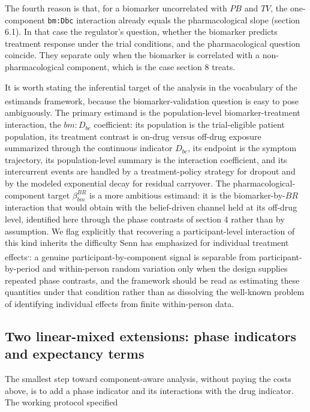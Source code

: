 \documentclass[
  11pt,
]{article}
\begin{document}
The fourth reason is that, for a biomarker uncorrelated with \(PB\) and \(TV\),
the one-component \texttt{bm:Dbc} interaction already equals the
pharmacological slope (section 6.1). In that case the regulator's question,
whether the biomarker predicts treatment response under the trial
conditions, and the pharmacological question coincide. They separate only
when the biomarker is correlated with a non-pharmacological component,
which is the case section 8 treats.

It is worth stating the inferential target of the analysis in the vocabulary
of the estimands framework\textsuperscript{}, because the biomarker-validation
question is easy to pose ambiguously. The primary estimand is the
population-level biomarker-treatment interaction, the \(bm{:}D_{bc}\)
coefficient: its population is the trial-eligible patient population, its
treatment contrast is on-drug versus off-drug exposure summarized through the
continuous indicator \(D_{bc}\), its endpoint is the symptom trajectory, its
population-level summary is the interaction coefficient, and its intercurrent
events are handled by a treatment-policy strategy for dropout and by the
modeled exponential decay for residual carryover. The
pharmacological-component target \(\beta_{bm}^{BR}\) is a more ambitious
estimand: it is the biomarker-by-\(BR\) interaction that would obtain with the
belief-driven channel held at its off-drug level, identified here through the
phase contrasts of section 4 rather than by assumption. We flag explicitly
that recovering a participant-level interaction of this kind inherits the
difficulty Senn has emphasized for individual treatment effects\textsuperscript{,}: a genuine participant-by-component signal is separable from
participant-by-period and within-person random variation only when the design
supplies repeated phase contrasts, and the framework should be read as
estimating these quantities under that condition rather than as dissolving the
well-known problem of identifying individual effects from finite within-person
data.

\subsection{Two linear-mixed extensions: phase indicators and expectancy terms}\label{two-linear-mixed-extensions-phase-indicators-and-expectancy-terms}

The smallest step toward component-aware analysis, without paying the
costs above, is to add a phase indicator and its interactions with the
drug indicator. The working protocol specified
\end{document}
